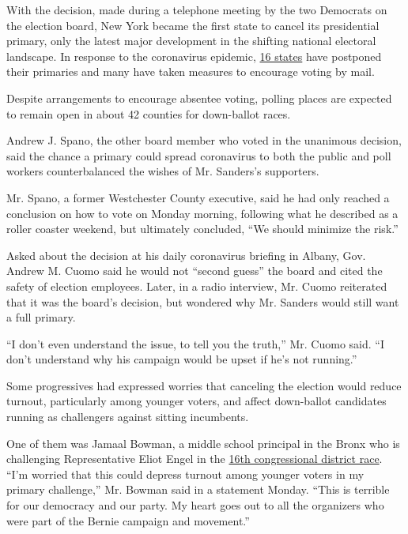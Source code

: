 With the decision, made during a telephone meeting by the two Democrats
on the election board, New York became the first state to cancel its
presidential primary, only the latest major development in the shifting
national electoral landscape. In response to the coronavirus epidemic,
\href{https://www.nytimes.com/article/2020-campaign-primary-calendar-coronavirus.html}{16
states} have postponed their primaries and many have taken measures to
encourage voting by mail.

Despite arrangements to encourage absentee voting, polling places are
expected to remain open in about 42 counties for down-ballot races.

Andrew J. Spano, the other board member who voted in the unanimous
decision, said the chance a primary could spread coronavirus to both the
public and poll workers counterbalanced the wishes of Mr. Sanders's
supporters.

Mr. Spano, a former Westchester County executive, said he had only
reached a conclusion on how to vote on Monday morning, following what he
described as a roller coaster weekend, but ultimately concluded, ``We
should minimize the risk.''

Asked about the decision at his daily coronavirus briefing in Albany,
Gov. Andrew M. Cuomo said he would not ``second guess'' the board and
cited the safety of election employees. Later, in a radio interview, Mr.
Cuomo reiterated that it was the board's decision, but wondered why Mr.
Sanders would still want a full primary.

``I don't even understand the issue, to tell you the truth,'' Mr. Cuomo
said. ``I don't understand why his campaign would be upset if he's not
running.''

Some progressives had expressed worries that canceling the election
would reduce turnout, particularly among younger voters, and affect
down-ballot candidates running as challengers against sitting
incumbents.

One of them was Jamaal Bowman, a middle school principal in the Bronx
who is challenging Representative Eliot Engel in the
\href{https://www.nytimes.com/2019/06/18/us/politics/jamaal-bowman-eliot-engel.html}{16th
congressional district race}. ``I'm worried that this could depress
turnout among younger voters in my primary challenge,'' Mr. Bowman said
in a statement Monday. ``This is terrible for our democracy and our
party. My heart goes out to all the organizers who were part of the
Bernie campaign and movement.''

